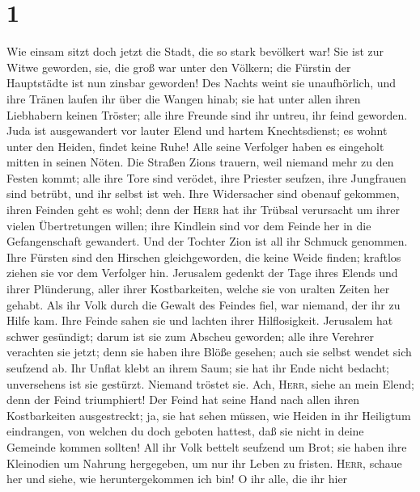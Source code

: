 \hypertarget{section}{%
\section{1}\label{section}}

 Wie einsam sitzt doch jetzt die Stadt, die so stark
bevölkert war! Sie ist zur Witwe geworden, sie, die groß war unter den
Völkern; die Fürstin der Hauptstädte ist nun zinsbar geworden!
 Des Nachts weint sie unaufhörlich, und ihre Tränen laufen
ihr über die Wangen hinab; sie hat unter allen ihren Liebhabern keinen
Tröster; alle ihre Freunde sind ihr untreu, ihr feind geworden.
 Juda ist ausgewandert vor lauter Elend und hartem
Knechtsdienst; es wohnt unter den Heiden, findet keine Ruhe! Alle seine
Verfolger haben es eingeholt mitten in seinen Nöten.  Die
Straßen Zions trauern, weil niemand mehr zu den Festen kommt; alle ihre
Tore sind verödet, ihre Priester seufzen, ihre Jungfrauen sind betrübt,
und ihr selbst ist weh.  Ihre Widersacher sind obenauf
gekommen, ihren Feinden geht es wohl; denn der \textsc{Herr} hat ihr
Trübsal verursacht um ihrer vielen Übertretungen willen; ihre Kindlein
sind vor dem Feinde her in die Gefangenschaft gewandert. 
Und der Tochter Zion ist all ihr Schmuck genommen. Ihre Fürsten sind den
Hirschen gleichgeworden, die keine Weide finden; kraftlos ziehen sie vor
dem Verfolger hin.  Jerusalem gedenkt der Tage ihres
Elends und ihrer Plünderung, aller ihrer Kostbarkeiten, welche sie von
uralten Zeiten her gehabt. Als ihr Volk durch die Gewalt des Feindes
fiel, war niemand, der ihr zu Hilfe kam. Ihre Feinde sahen sie und
lachten ihrer Hilflosigkeit.  Jerusalem hat schwer
gesündigt; darum ist sie zum Abscheu geworden; alle ihre Verehrer
verachten sie jetzt; denn sie haben ihre Blöße gesehen; auch sie selbst
wendet sich seufzend ab.  Ihr Unflat klebt an ihrem Saum;
sie hat ihr Ende nicht bedacht; unversehens ist sie gestürzt. Niemand
tröstet sie. Ach, \textsc{Herr}, siehe an mein Elend; denn der Feind
triumphiert!  Der Feind hat seine Hand nach allen ihren
Kostbarkeiten ausgestreckt; ja, sie hat sehen müssen, wie Heiden in ihr
Heiligtum eindrangen, von welchen du doch geboten hattest, daß sie nicht
in deine Gemeinde kommen sollten!  All ihr Volk bettelt
seufzend um Brot; sie haben ihre Kleinodien um Nahrung hergegeben, um
nur ihr Leben zu fristen. \textsc{Herr}, schaue her und siehe, wie
heruntergekommen ich bin!  O ihr alle, die ihr hier

